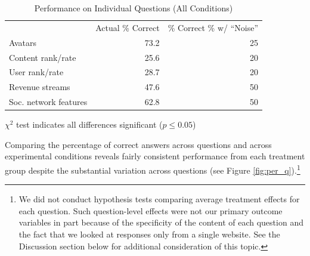 \documentclass{chi2009}
\begin{document}
{%
\begin{table}[ht]					%
\begin{center}						%
\caption{Performance on Individual Questions (All Conditions)} %
\vspace{8pt}
\begin{threeparttable}
\begin{tabular}{@{}l r r@{}}
\toprule
& Actual \% Correct & \% Correct \% w/ ``Noise'' \\
\cmidrule(l){2-3}
Avatars & 73.2 & 25\\ 
Content rank/rate & 25.6 & 20\\
User rank/rate & 28.7 & 20\\
Revenue streams & 47.6 & 50\\
Soc. network features & 62.8 & 50\\
\bottomrule
\end{tabular}
  \begin{tablenotes}[para]
     \small{\item $\chi^{2}$ test indicates all differences significant ($p \leq 0.05$)}
  \end{tablenotes}
\end{threeparttable}
\label{table:ind_q_results}
\end{center}
\end{table}

Comparing the percentage of correct answers across questions and
across experimental conditions reveals fairly consistent performance
from each treatment group despite the substantial variation
across questions (see Figure \ref{fig:per_q}).\footnote{We did not
  conduct hypothesis tests comparing average treatment effects for
  each question. Such question-level effects were not our primary
  outcome variables in part because of the specificity of the content
  of each question and the fact that we looked at responses only from
  a single website. See the Discussion section below for additional
  consideration of this topic.}

}
\end{document}
